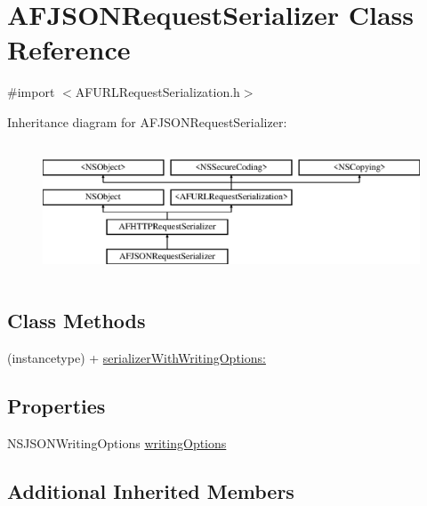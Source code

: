 \hypertarget{interface_a_f_j_s_o_n_request_serializer}{}\section{A\+F\+J\+S\+O\+N\+Request\+Serializer Class Reference}
\label{interface_a_f_j_s_o_n_request_serializer}


{\ttfamily \#import $<$A\+F\+U\+R\+L\+Request\+Serialization.\+h$>$}

Inheritance diagram for A\+F\+J\+S\+O\+N\+Request\+Serializer\+:\begin{figure}[H]
\begin{center}
\leavevmode
\includegraphics[height=3.992870cm]{interface_a_f_j_s_o_n_request_serializer}
\end{center}
\end{figure}
\subsection*{Class Methods}
\begin{DoxyCompactItemize}
\item 
(instancetype) + \hyperlink{interface_a_f_j_s_o_n_request_serializer_a53962511f37e48990159af5bc8959c30}{serializer\+With\+Writing\+Options\+:}
\end{DoxyCompactItemize}
\subsection*{Properties}
\begin{DoxyCompactItemize}
\item 
N\+S\+J\+S\+O\+N\+Writing\+Options \hyperlink{interface_a_f_j_s_o_n_request_serializer_ab69cc530353247cdd51d60279acc4e55}{writing\+Options}
\end{DoxyCompactItemize}
\subsection*{Additional Inherited Members}


